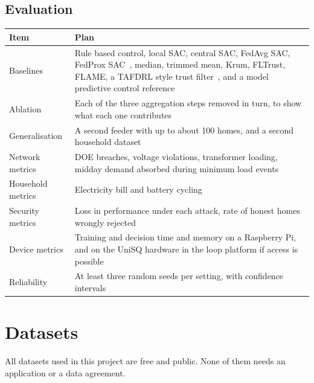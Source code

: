 \documentclass[11pt,a4paper]{article}
\begin{document}
\subsection{Evaluation}
\begin{center}
\small
\begin{tabularx}{\linewidth}{@{}lX@{}}
\toprule
\textbf{Item} & \textbf{Plan} \\
\midrule
Baselines & Rule based control, local SAC, central SAC, FedAvg SAC, FedProx SAC~\cite{sumayli2026}, median, trimmed mean, Krum, FLTrust, FLAME, a TAFDRL style trust filter~\cite{sepehrzad2026}, and a model predictive control reference \\
Ablation & Each of the three aggregation steps removed in turn, to show what each one contributes \\
Generalisation & A second feeder with up to about 100 homes, and a second household dataset \\
Network metrics & DOE breaches, voltage violations, transformer loading, midday demand absorbed during minimum load events \\
Household metrics & Electricity bill and battery cycling \\
Security metrics & Loss in performance under each attack, rate of honest homes wrongly rejected \\
Device metrics & Training and decision time and memory on a Raspberry Pi, and on the UniSQ hardware in the loop platform if access is possible \\
Reliability & At least three random seeds per setting, with confidence intervals \\
\bottomrule
\end{tabularx}
\end{center}

\section{Datasets}

All datasets used in this project are free and public. None of them needs an application or a data agreement.
\end{document}
